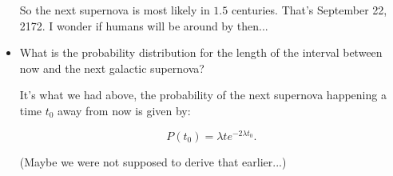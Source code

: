 \begin{itemize}
    So the next supernova is most likely in $1.5$ centuries.
    That's September 22, 2172. I wonder if humans will be around by then...

    \item What is the probability distribution for the length of the interval between
    now and the next galactic supernova?

    It's what we had above, the probability of the next supernova happening a time $t_0$ away from now is given by:

    $$P(t_0) = \lambda t e^{-2\lambda t_0}.$$

    (Maybe we were not supposed to derive that earlier...)

\end{itemize}


